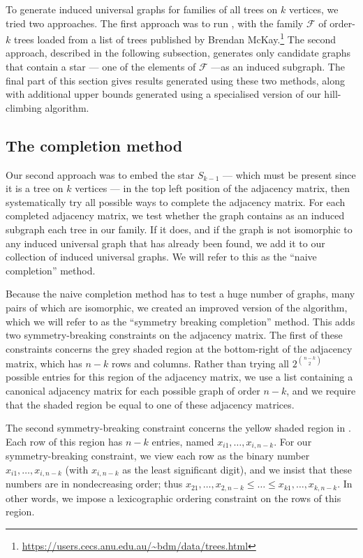 \documentclass[12pt]{article}
\newcommand{\calF}{\ensuremath{\mathcal{F}}}
\begin{document}
To generate induced universal graphs for families of
all trees on $k$ vertices, we tried two approaches.
The first approach was to run , with the family
$\calF$ of order-$k$ trees loaded from
a list of trees published by Brendan
McKay.\footnote{\url{https://users.cecs.anu.edu.au/~bdm/data/trees.html}}
The second approach, described in the following subsection, generates
only candidate graphs that contain a star --- one of the elements
of $\calF$ ---as an induced subgraph.  The final part of this section
gives results generated using these two methods, along with additional
upper bounds generated using a specialised version of our hill-climbing
algorithm.

\subsection{The completion method}

Our second approach was to embed the star $S_{k-1}$ --- which must be
present since it is a tree on $k$ vertices --- in the top left position
of the adjacency matrix, then systematically try all possible ways to complete
the adjacency matrix.  For each completed adjacency matrix, we test whether
the graph contains as an induced subgraph each tree in our family.
If it does, and if the graph is not isomorphic to any induced universal
graph that has already been found, we add it to our collection of induced
universal graphs.
We will refer to this as the ``naive completion'' method.

Because the naive completion method has to test a huge number of graphs,
many pairs of which are isomorphic, we created an improved version of the
algorithm, which we will refer to as the ``symmetry breaking completion''
method.  This adds two symmetry-breaking constraints on the adjacency matrix.
The first of these constraints concerns the grey shaded region at the bottom-right
of the adjacency matrix, which has $n - k$ rows and columns.  Rather than
trying all $2^{n-k \choose 2}$ possible entries for this region of the
adjacency matrix, we use a list containing a canonical adjacency matrix
for each possible graph of order $n-k$, and we require that the shaded
region be equal to one of these adjacency matrices.

The second symmetry-breaking constraint concerns the yellow shaded region
in . Each row of this region has $n-k$ entries,
named $x_{i1}, \dots, x_{i,n-k}$.  For our symmetry-breaking constraint, we
view each row as the binary number $x_{i1}, \dots, x_{i,n-k}$
(with $x_{i,n-k}$ as the least significant digit), and we insist
that these numbers are in nondecreasing order; thus
$x_{21}, \dots, x_{2,n-k} \leq \dots \leq x_{k1}, \dots, x_{k,n-k}$.
In other words, we impose a lexicographic ordering constraint
on the rows of this region.
\end{document}
